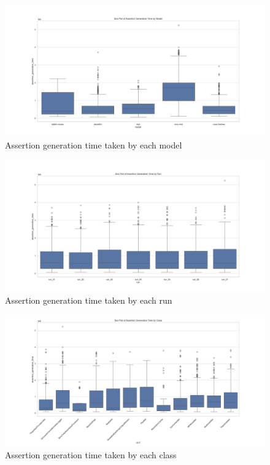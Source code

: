 \begin{figure}[H]
\centering
\includegraphics[width=1\textwidth]{images/assertion_time_by_model.png}
\caption{Assertion generation time taken by each model}
\label{fig:assertion_time_models}
\end{figure}

\begin{figure}[H]
\centering
\includegraphics[width=1\textwidth]{images/assertion_time_by_runs.png}
\caption{Assertion generation time taken by each run}
\label{fig:assertion_time_runs}
\end{figure}

\begin{figure}[H]
\centering
\includegraphics[width=1\textwidth]{images/assertion_time_by_class.png}
\caption{Assertion generation time taken by each class}
\label{fig:assertion_time_class}
\end{figure}

